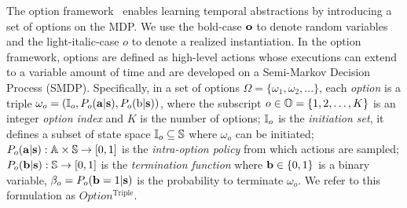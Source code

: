 \documentclass{article}
\begin{document}
The option framework~\cite{sutton1999between} enables learning temporal abstractions by
introducing a set of options on the MDP. We use the bold-case
${\mathbf{o}}$ to denote random variables and the light-italic-case $o$
to denote a realized instantiation. In the option framework, options are defined as high-level
actions whose executions can extend to a variable amount of time and are developed on a Semi-Markov Decision Process (SMDP). Specifically,
in a set of options $\Omega=\{\omega_1,\omega_2,...\}$, each
\emph{option} is a triple
$\omega_o=({\mathbb{I}}_{o},P_{o}({\mathbf{a}}|{\mathbf{s}}),P_{o}({\textnormal{b}}|{\mathbf{s}}))$, where the
subscript $o\in{\mathbb{O}}=\{1,2,\dots,K\}$ is an integer \emph{option
  index} and $K$ is the number of options; ${\mathbb{I}}_o$ is the
\emph{initiation set}, it defines a subset of state space
${\mathbb{I}}_o\subseteq{\mathbb{S}}$ where $\omega_o$ can be initiated;
$P_o({\mathbf{a}}|{\mathbf{s}}):{\mathbb{A}}\times{\mathbb{S}}\rightarrow[0,1]$ is the
\emph{intra-option policy} from which actions are sampled;
$P_o({\mathbf{b}}|{\mathbf{s}}):{\mathbb{S}}\rightarrow[0,1]$ is the \emph{termination
  function} where ${\mathbf{b}}\in \{0,1\}$ is a binary variable,
$\beta_o=P_o({\mathbf{b}}=1|{\mathbf{s}})$ is the probability to terminate
$\omega_o$. We refer to this formulation as $Option^{\textrm{Triple}}$.
\end{document}
